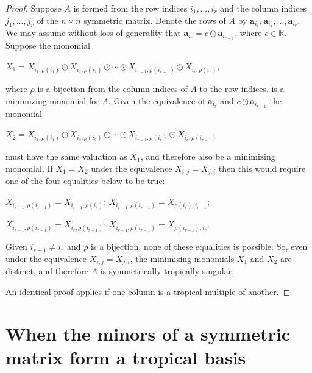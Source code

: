 \documentclass{article}
\begin{document}
\begin{proof}
  Suppose $A$ is formed from the row indices $i_{1},\ldots,i_{r}$ and the column indices $j_{1},\ldots,j_{r}$ of the $n \times n$ symmetric matrix. Denote the rows of $A$ by $\textbf{a}_{i_{1}},\textbf{a}_{i_{2}},\ldots,\textbf{a}_{i_{r}}$. We may assume without loss of generality that $\textbf{a}_{i_{r}} = c \odot \textbf{a}_{i_{r-1}}$, where $c \in \mathbb{R}$. Suppose the monomial
  \begin{center}
    $X_{1} = X_{i_{1},\rho(i_{1})} \odot X_{i_{2},\rho(i_{2})} \odot \cdots \odot X_{i_{r-1},\rho(i_{r-1})} \odot X_{i_{r},\rho(i_{r})}$,
  \end{center}
  where $\rho$ is a bijection from the column indices of $A$ to the row indices, is a minimizing monomial for $A$. Given the equivalence of $\textbf{a}_{i_{r}}$ and $c \odot \textbf{a}_{i_{r-1}}$ the monomial
  \begin{center}
    $X_{2} = X_{i_{1},\rho(i_{1})} \odot X_{i_{2},\rho(i_{2})} \odot \cdots \odot X_{i_{r-1},\rho(i_{r})} \odot X_{i_{r},\rho(i_{r-1})}$
  \end{center}
  must have the same valuation as $X_{1}$, and therefore also be a minimizing monomial. If $X_{1} = X_{2}$ under the equivalence $X_{i,j} = X_{j,i}$ then this would require one of the four equalities below to be true:
  \begin{center}
    $X_{i_{r-1},\rho(i_{r-1})} = X_{i_{r-1},\rho(i_{r})}$; \hspace{.1 in} $X_{i_{r-1},\rho(i_{r-1})} = X_{\rho(i_{r}),i_{r-1}}$;
    
    $X_{i_{r-1},\rho(i_{r-1})} = X_{i_{r},\rho(i_{r-1})}$; \hspace{.1 in} $X_{i_{r-1},\rho(i_{r-1})} = X_{\rho(i_{r-1}),i_{r}}$.
  \end{center}
  Given $i_{r-1} \neq i_{r}$ and $\rho$ is a bijection, none of these equalities is possible. So, even under the equivalence $X_{i,j} = X_{j,i}$, the minimizing monomials $X_{1}$ and $X_{2}$ are distinct, and therefore $A$ is symmetrically tropically singular.
  
  An identical proof applies if one column is a tropical multiple of another.
\end{proof}

\section{When the minors of a symmetric matrix form a tropical basis}
\end{document}
